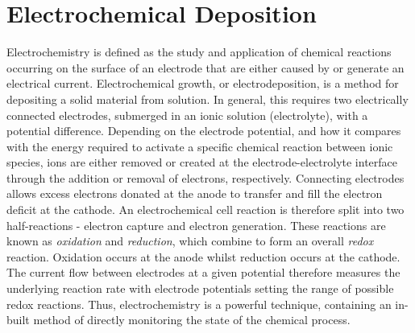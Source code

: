 \documentclass{article}
\begin{document}
\section{Electrochemical Deposition}


Electrochemistry is defined as the study and application of chemical reactions occurring on the surface of an electrode that are either caused by or generate an electrical current. Electrochemical growth, or electrodeposition, is a method for depositing a solid material from solution. In general, this requires two electrically connected electrodes, submerged in an ionic solution (electrolyte), with a potential difference. Depending on the electrode potential, and how it compares with the energy required to activate a specific chemical reaction between ionic species, ions are either removed or created at the electrode-electrolyte interface through the addition or removal of electrons, respectively. Connecting electrodes allows excess electrons donated at the anode to transfer and fill the electron deficit at the cathode. An electrochemical cell reaction is therefore split into two half-reactions - electron capture and electron generation. These reactions are known as \emph{oxidation} and \emph{reduction}, which combine to form an overall \emph{redox} reaction. Oxidation occurs at the anode whilst reduction occurs at the cathode. The current flow between electrodes at a given potential therefore measures the underlying reaction rate with electrode potentials setting the range of possible redox reactions. Thus, electrochemistry is a powerful technique, containing an in-built method of directly monitoring the state of the chemical process.
\end{document}
